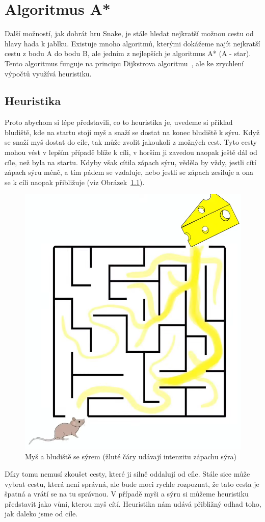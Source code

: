 \chapter{Algoritmus A*}\label{A*}
Další možností, jak dohrát hru Snake, je stále hledat nejkratší možnou cestu od hlavy hada k jablku. Existuje mnoho algoritmů, kterými dokážeme najít nejkratší cestu z bodu A do bodu B, ale jedním z nejlepších je algoritmus A* (A - star). Tento algoritmus funguje na principu Dijkstrova algoritmu~\cite{Sharma2025Dijkstra}, ale ke zrychlení výpočtů využívá heuristiku. 

\section{Heuristika}
Proto abychom si lépe představili, co to heuristika je, uvedeme si příklad bludiště, kde na startu stojí myš a snaží se dostat na konec bludiště k sýru. Když se snaží myš dostat do cíle, tak může zvolit jakoukoli z možných cest. Tyto cesty mohou vést v lepším případě blíže k cíli, v horším ji zavedou naopak ještě dál od cíle, než byla na startu. Kdyby však cítila zápach sýru, věděla by vždy, jestli cítí zápach sýru méně, a tím pádem se vzdaluje, nebo jestli se zápach zesiluje a ona se k cíli naopak přibližuje (viz Obrázek~\ref{fig:MouseAndMaze}).

\begin{figure}[h]
    \centering
    \includegraphics[width=0.5\linewidth]{Images/MouseAndMaze.png}
    \caption[Dostupné z: \url{https://www.youtube.com/watch?v=71CEj4gKDnE&ab_channel=AnishKrishnan}]{Myš a bludiště se sýrem (žluté čáry udávají intenzitu zápachu sýra)}
    \label{fig:MouseAndMaze}
\end{figure}

Díky tomu nemusí zkoušet cesty, které ji silně oddalují od cíle. Stále sice může vybrat cestu, která není správná, ale bude moci rychle rozpoznat, že tato cesta je špatná a vrátí se na tu správnou. V případě myši a sýru si můžeme heuristiku představit jako vůni, kterou myš cítí. Heuristika nám udává přibližný odhad toho, jak daleko jsme od cíle. 


